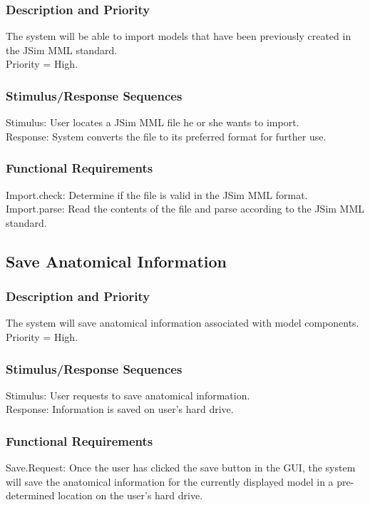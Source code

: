 \documentclass{article}
\begin{document}
\subsubsection{Description and Priority}
The system will be able to import models that have been previously created in the JSim MML standard.\\
Priority = High.

\subsubsection{Stimulus/Response Sequences}
Stimulus: User locates a JSim MML file he or she wants to import.\\
Response: System converts the file to its preferred format for further use.

\subsubsection{Functional Requirements}
Import.check: Determine if the file is valid in the JSim MML format.\\
Import.parse: Read the contents of the file and parse according to the JSim MML standard.

\subsection{Save Anatomical Information}
\subsubsection{Description and Priority}
The system will save anatomical information associated with model components.\\
Priority = High.

\subsubsection{Stimulus/Response Sequences}
Stimulus: User requests to save anatomical information.\\
Response: Information is saved on user's hard drive.

\subsubsection{Functional Requirements}
Save.Request: Once the user has clicked the save button in the GUI, the system will save the anatomical information for the currently displayed model in a pre-determined location on the user's hard drive.
\end{document}
